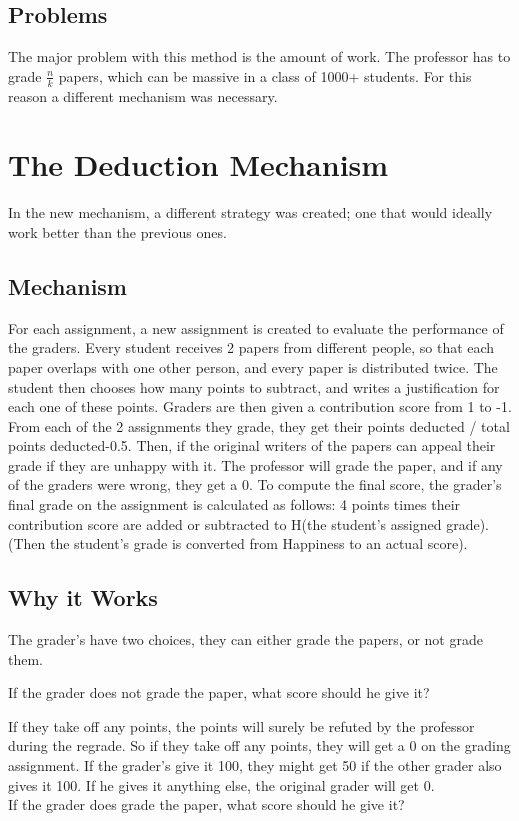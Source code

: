 \documentclass[12pt, Arial]{article}
\begin{document}
\subsection{Problems}
The major problem with this method is the amount of work. The professor has to grade $\frac{n}{k}$ papers, which can be massive in a class of 1000+ students. For this reason a different mechanism was necessary.

\section{The Deduction Mechanism}
In the new mechanism, a different strategy was created; one that would ideally work better than the previous ones.

\subsection{Mechanism}
For each assignment, a new assignment is created to evaluate the performance of the graders. Every student receives 2 papers from different people, so that each paper overlaps with one other person, and every paper is distributed twice. The student then chooses how many points to subtract, and writes a justification for each one of these points. Graders are then given a contribution score from 1 to -1. From each of the 2 assignments they grade, they get their points deducted / total points deducted-0.5. Then, if the original writers of the papers can appeal their grade if they are unhappy with it. The professor will grade the paper, and if any of the graders were wrong, they get a 0. To compute the final score, the grader's final grade on the assignment is calculated as follows: 4 points times their contribution score are added or subtracted to H(the student's assigned grade). (Then the student's grade is converted from Happiness to an actual score).

\subsection{Why it Works}
The grader's have two choices, they can either grade the papers, or not grade them.

If the grader does not grade the paper, what score should he give it?

If they take off any points, the points will surely be refuted by the professor during the regrade.
So if they take off any points, they will get a 0 on the grading assignment.
If the grader's give it 100, they might get 50 if the other grader also gives it 100. If he gives it anything else, the original grader will get 0.
$$$$
If the grader does grade the paper, what score should he give it?
\end{document}
